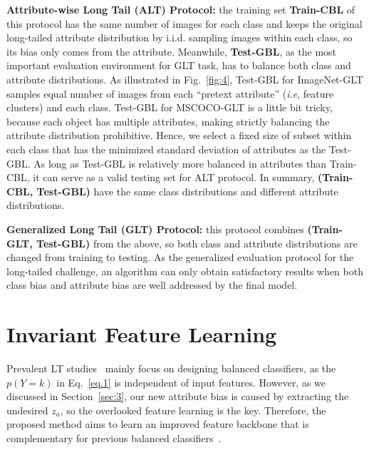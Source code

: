 \documentclass{article}
\def\ie{\emph{i.e}} \def\Ie{\emph{I.e}}
\begin{document}
\noindent\textbf{Attribute-wise Long Tail (ALT) Protocol:} the training set \textbf{Train-CBL} of this protocol has the same number of images for each class and keeps the original long-tailed attribute distribution by i.i.d. sampling images within each class, so its bias only comes from the attribute. Meanwhile, \textbf{Test-GBL}, as the most important evaluation environment for GLT task, has to balance both class and attribute distributions. As illustrated in Fig.~\ref{fig:4}, Test-GBL for ImageNet-GLT samples equal number of images from each ``pretext attribute'' (\ie, feature clusters) and each class. Test-GBL for MSCOCO-GLT is a little bit tricky, because each object has multiple attributes, making strictly balancing the attribute distribution prohibitive. Hence, we select a fixed size of subset within each class that has the minimized standard deviation of attributes as the Test-GBL. As long as Test-GBL is relatively more balanced in attributes than Train-CBL, it can serve as a valid testing set for ALT protocol. In summary, \textbf{(Train-CBL, Test-GBL)} have the same class distributions and different attribute distributions. 



\noindent\textbf{Generalized Long Tail (GLT) Protocol:} this protocol combines \textbf{(Train-GLT, Test-GBL)} from the above, so both class and attribute distributions are changed from training to testing. As the generalized evaluation protocol for the long-tailed challenge, an algorithm can only obtain satisfactory results when both class bias and attribute bias are well addressed by the final model.






















 
\section{Invariant Feature Learning}
\label{sec:4}



Prevalent LT studies~\cite{menon2020long,kang2019decoupling} mainly focus on designing balanced classifiers, as the $p(Y=k)$ in Eq.~\eqref{eq.1} is independent of input features. However, as we discussed in Section~\ref{sec:3},  our new attribute bias is caused by extracting the undesired $z_a$, so the overlooked feature learning is the key. Therefore, the proposed method aims to learn an improved feature backbone that is complementary for previous balanced classifiers~\cite{kang2019decoupling,tang2020long,ren2020balanced,menon2020long}. 
\end{document}
